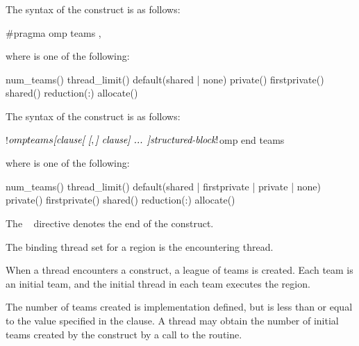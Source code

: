 \syntax
\begin{ccppspecific}
The syntax of the  construct is as follows:

\begin{ompcPragma}
#pragma omp teams \plc{[clause[ [},\plc{] clause] ... ] new-line}
\end{ompcPragma}

where  is one of the following:

\begin{indentedcodelist}
num_teams()
thread_limit()
default(shared \textnormal{|} none)
private()
firstprivate()
shared()
reduction(:)
allocate(\plc{[allocator: ]})
\end{indentedcodelist}
\end{ccppspecific}

\begin{fortranspecific}
The syntax of the  construct is as follows:

\begin{ompfPragma}
!$omp teams \plc{[clause[ [},\plc{] clause] ... ]}
    \plc{structured-block}
!$omp end teams
\end{ompfPragma}


where  is one of the following:

\begin{indentedcodelist}
num_teams()
thread_limit()
default(shared \textnormal{|} firstprivate \textnormal{|} private \textnormal{|} none)
private()
firstprivate()
shared()
reduction(:)
allocate(\plc{[allocator: ]})
\end{indentedcodelist}

The ~ directive denotes the end of the  construct.
\end{fortranspecific}

\begin{samepage}

\binding
The binding thread set for a  region is the encountering thread.

\descr
When a thread encounters a  construct, a league of teams is
created. Each team is an initial team, and the initial thread in each team
executes the  region.

The number of teams created is implementation defined, but is less than or equal to the
value specified in the  clause.
A thread may obtain the number of initial teams created by the construct by a call to the  routine.

\end{samepage}

